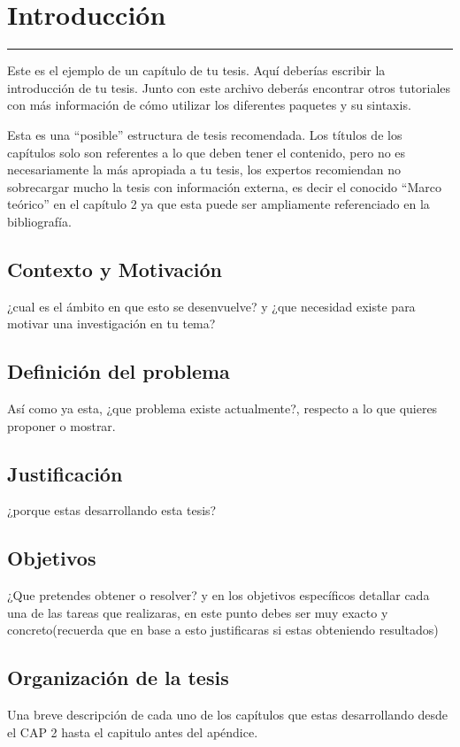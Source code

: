 \chapter{Introducción}
\hrule \bigskip \vspace*{1cm}


Este es el ejemplo de un capítulo de tu tesis. Aquí deberías
escribir la introducción de tu tesis. Junto con este archivo
deberás encontrar otros tutoriales con más información de cómo
utilizar los diferentes paquetes y su sintaxis.

Esta es una ``posible'' estructura de tesis recomendada. Los títulos
de los capítulos solo son referentes a lo que deben tener el
contenido, pero no es necesariamente la más apropiada a tu tesis,
los expertos recomiendan no sobrecargar mucho la tesis con
información externa, es decir el conocido ``Marco teórico'' en el
capítulo 2 ya que esta puede ser ampliamente referenciado en la
bibliografía.

\section{Contexto y Motivación}

¿cual es el ámbito en que esto se desenvuelve? y ¿que necesidad
existe para motivar una investigación en tu tema?

\section{Definición del problema}

Así como ya esta, ¿que problema existe actualmente?, respecto a lo
que quieres proponer o mostrar.

\section{Justificación}

¿porque estas desarrollando esta tesis?

\section{Objetivos}

¿Que pretendes obtener o resolver? y en los objetivos específicos
detallar cada una de las tareas que realizaras, en este punto debes
ser muy exacto y concreto(recuerda que en base a esto justificaras
si estas obteniendo resultados)

\section{Organización de la tesis}

Una breve descripción de cada uno de los capítulos que estas
desarrollando desde el CAP 2 hasta el capitulo antes del apéndice.
